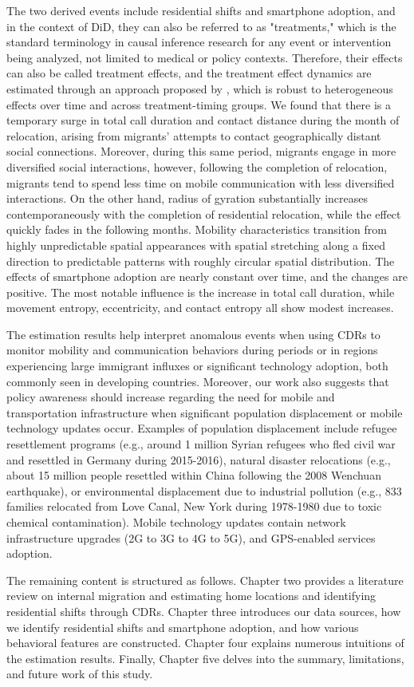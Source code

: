 The two derived events include residential shifts and smartphone adoption, and in the context of DiD, they can also be referred to as "treatments," which is the standard terminology in causal inference research for any event or intervention being analyzed, not limited to medical or policy contexts.
Therefore, their effects can also be called treatment effects, and the treatment effect dynamics are estimated through an approach proposed by \cite{callaway2021difference}, which is robust to heterogeneous effects over time and across treatment-timing groups.
We found that there is a temporary surge in total call duration and contact distance during the month of relocation, arising from migrants' attempts to contact geographically distant social connections.
Moreover, during this same period, migrants engage in more diversified social interactions, however, following the completion of relocation, migrants tend to spend less time on mobile communication with less diversified interactions.
On the other hand, radius of gyration substantially increases contemporaneously with the completion of residential relocation, while the effect quickly fades in the following months.
Mobility characteristics transition from highly unpredictable spatial appearances with spatial stretching along a fixed direction to predictable patterns with roughly circular spatial distribution.
The effects of smartphone adoption are nearly constant over time, and the changes are positive.
The most notable influence is the increase in total call duration, while movement entropy, eccentricity, and contact entropy all show modest increases.

The estimation results help interpret anomalous events when using CDRs to monitor mobility and communication behaviors during periods or in regions experiencing large immigrant influxes or significant technology adoption, both commonly seen in developing countries.
Moreover, our work also suggests that policy awareness should increase regarding the need for mobile and transportation infrastructure when significant population displacement or mobile technology updates occur.
Examples of population displacement include refugee resettlement programs (e.g., around 1 million Syrian refugees who fled civil war and resettled in Germany during 2015-2016), natural disaster relocations (e.g., about 15 million people resettled within China following the 2008 Wenchuan earthquake), or environmental displacement due to industrial pollution (e.g., 833 families relocated from Love Canal, New York during 1978-1980 due to toxic chemical contamination).
Mobile technology updates contain network infrastructure upgrades (2G to 3G to 4G to 5G), and GPS-enabled services adoption.

The remaining content is structured as follows. Chapter two provides a literature review on internal migration and estimating home locations and identifying residential shifts through CDRs.
Chapter three introduces our data sources, how we identify residential shifts and smartphone adoption, and how various behavioral features are constructed.
Chapter four explains numerous intuitions of the estimation results.
Finally, Chapter five delves into the summary, limitations, and future work of this study.
